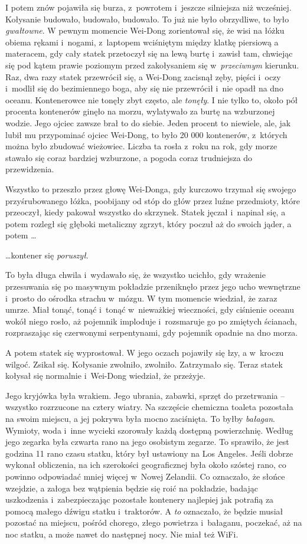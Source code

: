 \documentclass[oneside,polish,11pt,rmheadings]{mwbk}
\begin{document}
I potem znów pojawiła się burza, z~powrotem i~jeszcze silniejsza niż wcześniej. Kołysanie budowało, budowało, budowało. To już nie było obrzydliwe, to było \textit{gwałtowne}. W pewnym momencie Wei-Dong zorientował się, że wisi na łóżku obiema rękami i~nogami, z~laptopem wciśniętym między klatkę piersiową a materacem, gdy cały statek przetoczył się na lewą burtę i~zawisł tam, chwiejąc się pod kątem prawie poziomym przed zakołysaniem się w~\textit{przeciwnym} kierunku. Raz, dwa razy statek przewrócił się, a Wei-Dong zacisnął zęby, pięści i~oczy i~modlił się do bezimiennego boga, aby się nie przewrócił i~nie opadł na dno oceanu. Kontenerowce nie tonęły zbyt często, ale \textit{tonęły}. I nie tylko to, około pół procenta kontenerów ginęło na morzu, wylatywało za burtę na wzburzonej wodzie. Jego ojciec zawsze brał to do siebie. Jeden procent to niewiele, ale, jak lubił mu przypominać ojciec Wei-Dong, to było 20 000 kontenerów, z~których można było zbudować wieżowiec. Liczba ta rosła z~roku na rok, gdy morze stawało się coraz bardziej wzburzone, a pogoda coraz trudniejsza do przewidzenia.
 
 Wszystko to przeszło przez głowę Wei-Donga, gdy kurczowo trzymał się swojego przyśrubowanego łóżka, poobijany od stóp do głów przez luźne przedmioty, które przeoczył, kiedy pakował wszystko do skrzynek. Statek jęczał i~napinał się, a potem rozległ się głęboki metaliczny zgrzyt, który poczuł aż do swoich jąder, a potem \ldots 

 \ldots  kontener się \textit{poruszył}.

To była długa chwila i~wydawało się, że wszystko ucichło, gdy wrażenie przesuwania się po masywnym pokładzie przeniknęło przez jego ucho wewnętrzne i~prosto do ośrodka strachu w~mózgu. W tym momencie wiedział, że zaraz umrze. Miał tonąć, tonąć i~tonąć w~nieważkiej wieczności, gdy ciśnienie oceanu wokół niego rosło, aż pojemnik imploduje i~rozsmaruje go po zmiętych ścianach, rozpraszając się czerwonymi serpentynami, gdy pojemnik opadnie na dno morza.

A potem statek się wyprostował. W jego oczach pojawiły się łzy, a w~kroczu wilgoć. Zsikał się. Kołysanie zwolniło, zwolniło. Zatrzymało się. Teraz statek kołysał się normalnie i~Wei-Dong wiedział, że przeżyje.

Jego kryjówka była wrakiem. Jego ubrania, zabawki, sprzęt do przetrwania -- wszystko rozrzucone na cztery wiatry. Na szczęście chemiczna toaleta pozostała na swoim miejscu, a jej pokrywa była mocno zaciśnięta. To byłby \textit{bałagan}. Wymioty, woda i~inne wycieki szorowały każdą dostępną powierzchnię. Według jego zegarka była czwarta rano na jego osobistym zegarze. To sprawiło, że jest godzina 11 rano czasu statku, który był ustawiony na Los Angeles. Jeśli dobrze wykonał obliczenia, na ich szerokości geograficznej była około szóstej rano, co powinno odpowiadać mniej więcej w~Nowej Zelandii. Co oznaczało, że słońce wzejdzie, a załoga bez wątpienia będzie się roić na pokładzie, badając uszkodzenia i~zabezpieczając pozostałe kontenery najlepiej jak potrafią za pomocą małego dźwigu statku i~traktorów. A \textit{to }oznaczało, że będzie musiał pozostać na miejscu, pośród chorego, złego powietrza i~bałaganu, poczekać, aż na noc statku, a może nawet do następnej nocy. Nie miał też WiFi.
\end{document}

